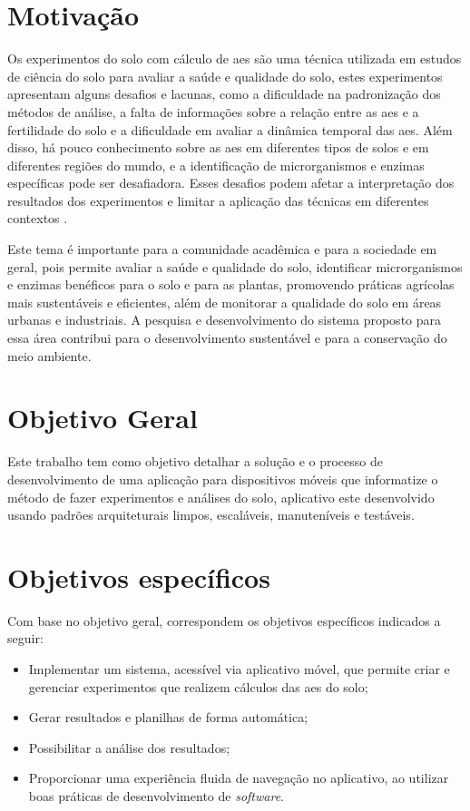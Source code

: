\section[Motivação]{Motivação}
Os experimentos do solo com cálculo de \acp{ae} são uma técnica utilizada em estudos de ciência do solo para avaliar a saúde e qualidade do solo, estes experimentos apresentam alguns desafios e lacunas, como a dificuldade na padronização dos métodos de análise, a falta de informações sobre a relação entre as \acp{ae} e a fertilidade do solo e a dificuldade em avaliar a dinâmica temporal das \acp{ae}. Além disso, há pouco conhecimento sobre as \acp{ae} em diferentes tipos de solos e em diferentes regiões do mundo, e a identificação de microrganismos e enzimas específicas pode ser desafiadora. Esses desafios podem afetar a interpretação dos resultados dos experimentos e limitar a aplicação das técnicas em diferentes contextos \cite{tabatabai1994soil}.

Este tema é importante para a comunidade acadêmica e para a sociedade em geral, pois permite avaliar a saúde e qualidade do solo, identificar microrganismos e enzimas benéficos para o solo e para as plantas, promovendo práticas agrícolas mais sustentáveis e eficientes, além de monitorar a qualidade do solo em áreas urbanas e industriais. A pesquisa e desenvolvimento do sistema proposto para essa área contribui para o desenvolvimento sustentável e para a conservação do meio ambiente.
 
\section{Objetivo Geral}\label{sec:objetivo_geral}

Este trabalho tem como objetivo detalhar a solução e o processo de desenvolvimento de uma aplicação para dispositivos móveis que informatize o método de fazer experimentos e análises do solo, aplicativo este desenvolvido usando padrões arquiteturais limpos, escaláveis, manuteníveis e testáveis.

\section{Objetivos específicos}\label{sec:objetivo_específico}
Com base no objetivo geral, correspondem os objetivos específicos indicados a seguir:

\begin{itemize}
    \item Implementar um sistema, acessível via aplicativo móvel, que permite criar e gerenciar experimentos que realizem cálculos das \acp{ae} do solo;
    \item Gerar resultados e planilhas de forma automática;
    \item Possibilitar a análise dos resultados;
    \item Proporcionar uma experiência fluida de navegação no aplicativo, ao utilizar boas práticas de desenvolvimento de \textit{software}.
\end{itemize}

